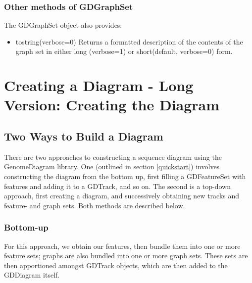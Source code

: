 \documentclass{article}
\begin{document}
\subsubsection{Other methods of GDGraphSet}
The GDGraphSet object also provides:
\begin{itemize}
\item {to\us string(verbose=0)}
Returns a formatted description of the contents of the graph set in either 
long (verbose=1) or short(default, verbose=0) form.
\end{itemize}


\section{Creating a Diagram - Long Version: Creating the 
Diagram}\label{longcreatediagram}
\subsection{Two Ways to Build a Diagram}
There are two approaches to constructing a sequence diagram using the 
GenomeDiagram library.  One (outlined in section \ref{quickstart}) involves 
constructing the diagram from the bottom up, first filling a GDFeatureSet 
with features and adding it to a GDTrack, and so on.  The second is a top-down 
approach, first creating a diagram, and successively obtaining new tracks and 
feature- and graph sets.  Both methods are described below.

\subsubsection{Bottom-up}
For this approach, we obtain our features, then bundle them into one or more 
feature sets; graphs are also bundled into one or more graph sets.  These sets 
are then apportioned amongst GDTrack objects, which are then added to the 
GDDiagram itself.
\end{document}
